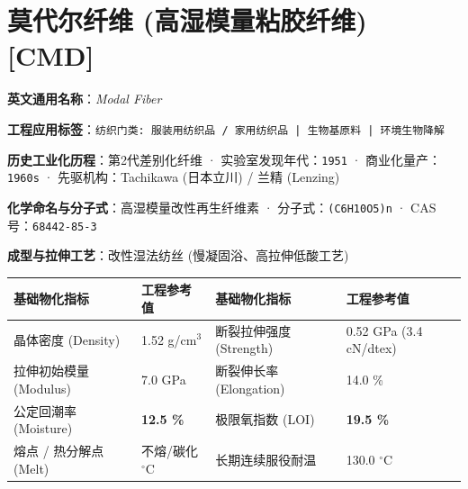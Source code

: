 \documentclass[11pt,openright,twoside,UTF8]{ctexbook}
\begin{document}
\section{莫代尔纤维 (高湿模量粘胶纤维) [CMD]}
\label{sec:cmd}

\noindent\textbf{英文通用名称}：\textit{Modal Fiber}\par
\noindent\textbf{工程应用标签}：\texttt{纺织门类: 服装用纺织品 / 家用纺织品 | 生物基原料 | 环境生物降解}\par
\noindent\textbf{历史工业化历程}：第2代差别化纤维 · 实验室发现年代：\texttt{1951} · 商业化量产：\texttt{1960s} · 先驱机构：Tachikawa (日本立川) / 兰精 (Lenzing)\par
\noindent\textbf{化学命名与分子式}：高湿模量改性再生纤维素 · 分子式：\texttt{(C6H10O5)n} · CAS 号：\texttt{68442-85-3}\par
\noindent\textbf{成型与拉伸工艺}：改性湿法纺丝 (慢凝固浴、高拉伸低酸工艺)\par

\vspace{0.15cm}
\begin{center}
\small
\begin{tabularx}{\textwidth}{p{3.8cm}Xp{3.8cm}X}
\toprule
\textbf{基础物化指标} & \textbf{工程参考值} & \textbf{基础物化指标} & \textbf{工程参考值} \\
\midrule
晶体密度 (Density) & 1.52 g/cm$^3$ & 断裂拉伸强度 (Strength) & 0.52 GPa (3.4 cN/dtex) \\
拉伸初始模量 (Modulus) & 7.0 GPa & 断裂伸长率 (Elongation) & 14.0 \% \\
公定回潮率 (Moisture) & \textbf{12.5 \%} & 极限氧指数 (LOI) & \textbf{19.5 \%} \\
熔点 / 热分解点 (Melt) & 不熔/碳化 $^\circ\mathrm{C}$ & 长期连续服役耐温 & 130.0 $^\circ\mathrm{C}$ \\
\bottomrule
\end{tabularx}
\end{center}
\vspace{0.15cm}
\end{document}

